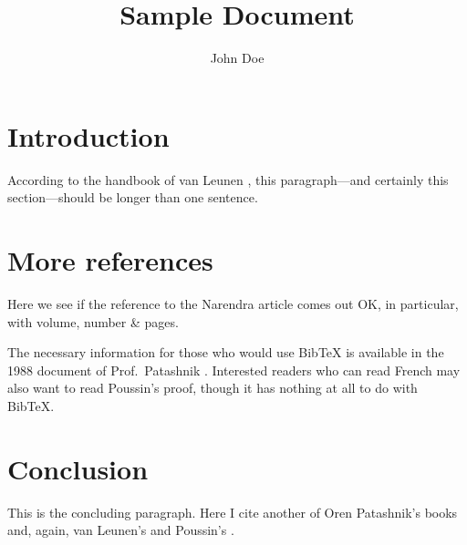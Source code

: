 \documentclass[11pt]{article}
\author{John Doe} \title{Sample Document}
\begin{document}
\maketitle

\section{Introduction}

According to the handbook of van Leunen \cite{vanleunen},
this paragraph---and certainly this
section---should be longer than one sentence.

\section{More references}

Here we see if the reference \cite{Narendra_1990}
to the Narendra article comes out OK, in particular,
with volume, number \& pages.

The necessary information for those who would use BibTeX
is available in the 1988 document of Prof.\ Patashnik \cite{btxdoc}.
Interested readers who can read French may also
want to read Poussin's proof\cite{primes}, though
it has nothing at all to do with BibTeX.

\section{Conclusion}

This is the concluding paragraph.  Here I cite another of
Oren Patashnik's books\cite{btxhak} and, again,
van Leunen's and Poussin's \cite{vanleunen,primes}.

\end{document}

